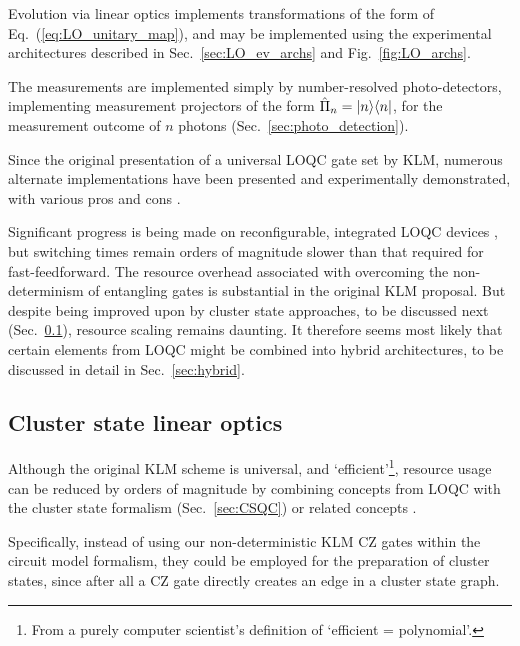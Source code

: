 Evolution via linear optics implements transformations of the form of Eq.~(\ref{eq:LO_unitary_map}), and may be implemented using the experimental architectures described in Sec.~\ref{sec:LO_ev_archs} and Fig.~\ref{fig:LO_archs}.

The measurements are implemented simply by number-resolved photo-detectors, implementing measurement projectors of the form \mbox{$\hat\Pi_n=|n\rangle\langle n|$}, for the measurement outcome of $n$ photons (Sec.~\ref{sec:photo_detection}).

Since the original presentation of a universal LOQC gate set by KLM, numerous alternate implementations have been presented and experimentally demonstrated, with various pros and cons \cite{bib:Ralph01, bib:Pittman01, bib:Ralph02, bib:Knill02, bib:Pittman03, bib:MorYoran06}.

Significant progress is being made on reconfigurable, integrated LOQC devices \cite{bib:UniversalLOOBrien}, but switching times remain orders of magnitude slower than that required for fast-feedforward. The resource overhead associated with overcoming the non-determinism of entangling gates is substantial in the original KLM proposal. But despite being improved upon by cluster state approaches, to be discussed next (Sec.~\ref{sec:CS_LO}), resource scaling remains daunting. It therefore seems most likely that certain elements from LOQC might be combined into hybrid architectures, to be discussed in detail in Sec.~\ref{sec:hybrid}.

%
%

\subsection{Cluster state linear optics} \label{sec:CS_LO} 

Although the original KLM scheme is universal, and `efficient'\footnote{From a purely computer scientist's definition of `efficient = polynomial'.}, resource usage can be reduced by orders of magnitude by combining concepts from LOQC with the cluster state formalism (Sec.~\ref{sec:CSQC}) or related concepts \cite{bib:YoranReznik03, bib:Nielsen04, bib:BrowneRudolph05, bib:GilchristHayes05, bib:Lim05, bib:LimBarrett05}.

Specifically, instead of using our non-deterministic KLM CZ gates within the circuit model formalism, they could be employed for the preparation of cluster states, since after all a CZ gate directly creates an edge in a cluster state graph.

